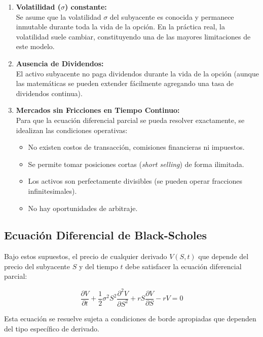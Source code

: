 \begin{enumerate}
    \item \textbf{Volatilidad ($\sigma$) constante:}\\
    Se asume que la volatilidad $\sigma$ del subyacente es conocida y permanece inmutable durante toda la vida de la opción. En la práctica real, la volatilidad suele cambiar, constituyendo una de las mayores limitaciones de este modelo.
    
    \item \textbf{Ausencia de Dividendos:}\\
    El activo subyacente no paga dividendos durante la vida de la opción (aunque las matemáticas se pueden extender fácilmente agregando una tasa de dividendos continua).
    
    \item \textbf{Mercados sin Fricciones en Tiempo Continuo:}\\
    Para que la ecuación diferencial parcial se pueda resolver exactamente, se idealizan las condiciones operativas:
    \begin{itemize}
        \item No existen costos de transacción, comisiones financieras ni impuestos.
        \item Se permite tomar posiciones cortas (\textit{short selling}) de forma ilimitada.
        \item Los activos son perfectamente divisibles (se pueden operar fracciones infinitesimales).
        \item No hay oportunidades de arbitraje.
    \end{itemize}
\end{enumerate}

\subsection{Ecuación Diferencial de Black-Scholes}

Bajo estos supuestos, el precio de cualquier derivado $V(S,t)$ que depende del precio del subyacente $S$ y del tiempo $t$ debe satisfacer la ecuación diferencial parcial:

\begin{equation}
\frac{\partial V}{\partial t} + \frac{1}{2}\sigma^2 S^2 \frac{\partial^2 V}{\partial S^2} + rS\frac{\partial V}{\partial S} - rV = 0
\end{equation}

Esta ecuación se resuelve sujeta a condiciones de borde apropiadas que dependen del tipo específico de derivado.

